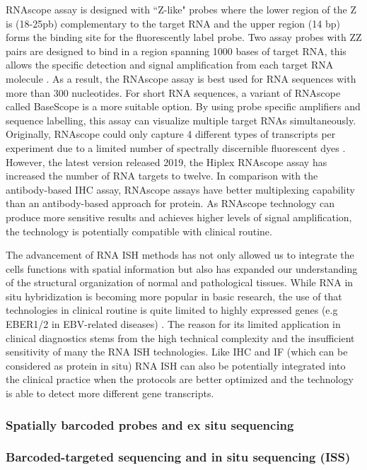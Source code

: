 RNAscope assay is designed with ``Z-like" probes where the lower region of the Z is (18-25pb) complementary to the target RNA and the upper region (14 bp) forms the binding site for the fluorescently label probe. Two assay probes with ZZ pairs are designed to bind in a region spanning 1000 bases of target RNA, this allows the specific detection and signal amplification from each target RNA molecule \cite{solanki2020visualization}. As a result, the RNAscope assay is best used for RNA sequences with more than 300 nucleotides. For short RNA sequences, a variant of RNAscope called BaseScope is a more suitable option. By using probe specific amplifiers and sequence labelling, this assay can visualize multiple target RNAs simultaneously. Originally, RNAscope could only capture 4 different types of transcripts per experiment due to a limited number of spectrally discernible fluorescent dyes \cite{wang2012rnascope}. However, the latest version released 2019, the Hiplex RNAscope assay has increased the number of RNA targets to twelve. In comparison with the antibody-based IHC assay, RNAscope assays have better multiplexing capability than an antibody-based approach for protein. As RNAscope technology can produce more sensitive results and achieves higher levels of signal amplification, the technology is potentially compatible with clinical routine.

The advancement of RNA ISH methods has not only allowed us to integrate the cells functions with spatial information but also has expanded our understanding of the structural organization of normal and pathological tissues. While RNA in situ hybridization is becoming more popular in basic research, the use of that technologies in clinical routine is quite limited to highly expressed genes (e.g EBER1/2 in EBV-related diseases) \cite{gulley2001molecular}. The reason for its limited application in clinical diagnostics stems from the high technical complexity and the insufficient sensitivity of many the RNA ISH technologies. Like IHC and IF (which can be considered as protein in situ) RNA ISH can also be potentially integrated into the clinical practice when the protocols are better optimized and the technology is able to detect more different gene transcripts.
\subsubsection{Spatially barcoded probes and ex situ sequencing}
\subsubsection{Barcoded-targeted sequencing and in situ sequencing (ISS)}

